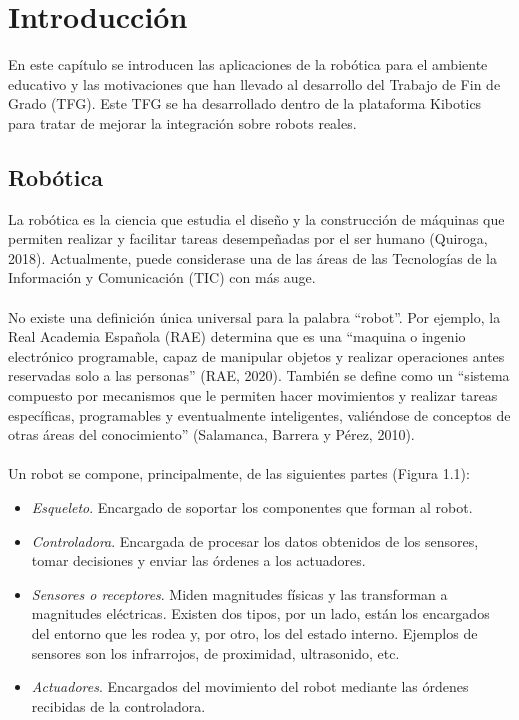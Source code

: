 \documentclass{report}
\begin{document}
\renewcommand{\chaptername}{Capítulo}


\chapter{Introducción}

En este capítulo se introducen las aplicaciones de la robótica para el ambiente educativo y las motivaciones que han llevado al desarrollo del Trabajo de Fin de Grado (TFG). Este TFG se ha desarrollado dentro de la plataforma Kibotics para tratar de mejorar la integración sobre robots reales. 

\section{Robótica}

La robótica es la ciencia que estudia el diseño y la construcción de máquinas que permiten realizar y facilitar tareas desempeñadas por el ser humano (Quiroga, 2018). Actualmente, puede considerase una de las áreas de las Tecnologías de la Información y Comunicación (TIC) con más auge.
\\
\\
No existe una definición única universal para la palabra “robot”. Por ejemplo, la Real Academia Española (RAE) determina que es una “maquina o ingenio electrónico programable, capaz de manipular objetos y realizar operaciones antes reservadas solo a las personas” (RAE, 2020). También se define como un “sistema compuesto por mecanismos que le permiten hacer movimientos y realizar tareas específicas, programables y eventualmente inteligentes, valiéndose de conceptos de otras áreas del conocimiento” (Salamanca, Barrera y Pérez, 2010).
\\
\\
Un robot se compone, principalmente, de las siguientes partes (Figura 1.1):
\begin{itemize}
	\item \textit{Esqueleto}. Encargado de soportar los componentes que forman al robot.

	\item \textit{Controladora}. Encargada de procesar los datos obtenidos de los sensores, tomar decisiones y enviar las órdenes a los actuadores.
		
	\item \textit{Sensores o receptores}. Miden magnitudes físicas y las transforman a magnitudes eléctricas. Existen dos tipos, por un lado, están los encargados del entorno que les rodea y, por otro, los del estado interno. Ejemplos de sensores son los infrarrojos, de proximidad, ultrasonido, etc.
	
	\item \textit{Actuadores}. Encargados del movimiento del robot mediante las órdenes recibidas de la controladora.
\end{itemize}
\end{document}
